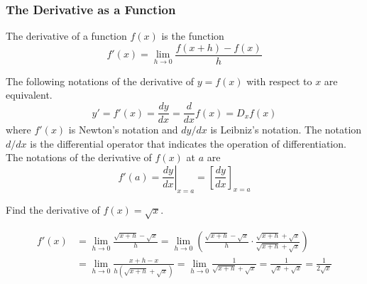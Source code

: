 \subsubsection*{The Derivative as a Function}
\begin{definition}
    The derivative of a function \(f(x)\) is the function
    \[f'(x)=\lim_{h\to 0}\frac{f(x+h)-f(x)}{h}\]
\end{definition}
The following notations of the derivative of \(y=f(x)\) with respect to \(x\)
are equivalent.
\[y'=f'(x)=\frac{dy}{dx}=\frac{d}{dx}f(x)=D_x f(x)\]
where \(f'(x)\) is Newton's notation and \(dy/dx\) is Leibniz's notation.
The notation \(d/dx\) is the differential operator that indicates the
operation of differentiation.
The notations of the derivative of \(f(x)\) at \(a\) are
\[f'(a)=\left.\frac{dy}{dx}\right|_{x=a}=\left[\frac{dy}{dx}\right]_{x=a}\]
\begin{problem}
    Find the derivative of \(f(x)=\sqrt{x}\).
\end{problem}
\begin{solution}
    \begin{align*}
        f'(x) &= \lim_{h\to 0}\frac{\sqrt{x+h}-\sqrt{x}}{h}=\lim_{h\to 0}
        \left(\frac{\sqrt{x+h}-\sqrt{x}}{h}\cdot
        \frac{\sqrt{x+h}+\sqrt{x}}{\sqrt{x+h}+\sqrt{x}}\right) \\
        &= \lim_{h\to 0}\frac{x+h-x}{h(\sqrt{x+h}+\sqrt{x})}
        =\lim_{h\to 0}\frac{1}{\sqrt{x+h}+\sqrt{x}}
        =\frac{1}{\sqrt{x}+\sqrt{x}}=\frac{1}{2\sqrt{x}} 
    \end{align*}
\end{solution}

